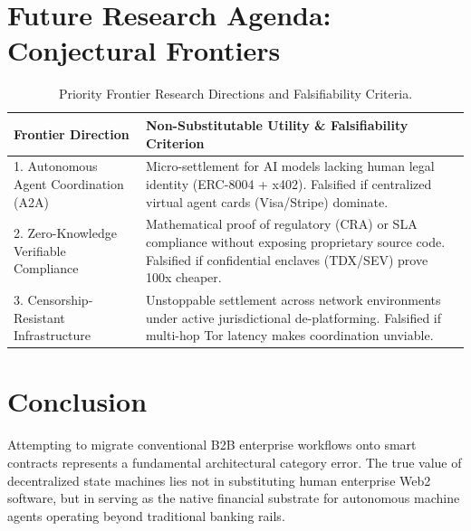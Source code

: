 \documentclass[10pt,a4paper]{article}
\begin{document}
\section{Future Research Agenda: Conjectural Frontiers}
\begin{table}[h]
\centering
\caption{Priority Frontier Research Directions and Falsifiability Criteria.}
\begin{tabularx}{\textwidth}{lX}
\toprule
\textbf{Frontier Direction} & \textbf{Non-Substitutable Utility \& Falsifiability Criterion} \\
\midrule
1. Autonomous Agent Coordination (A2A) & Micro-settlement for AI models lacking human legal identity (ERC-8004 + x402). Falsified if centralized virtual agent cards (Visa/Stripe) dominate. \\
2. Zero-Knowledge Verifiable Compliance & Mathematical proof of regulatory (CRA) or SLA compliance without exposing proprietary source code. Falsified if confidential enclaves (TDX/SEV) prove 100x cheaper. \\
3. Censorship-Resistant Infrastructure & Unstoppable settlement across network environments under active jurisdictional de-platforming. Falsified if multi-hop Tor latency makes coordination unviable. \\
\bottomrule
\end{tabularx}
\end{table}

\section{Conclusion}
Attempting to migrate conventional B2B enterprise workflows onto smart contracts represents a fundamental architectural category error. The true value of decentralized state machines lies not in substituting human enterprise Web2 software, but in serving as the native financial substrate for autonomous machine agents operating beyond traditional banking rails.
\end{document}
